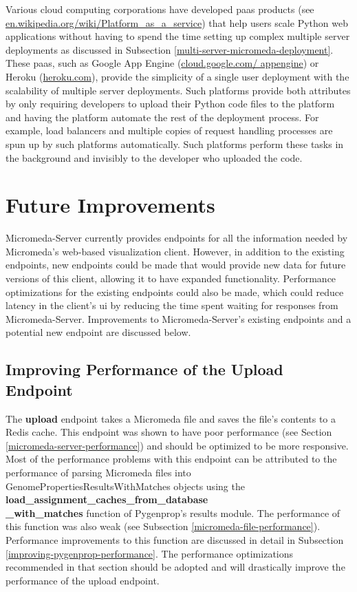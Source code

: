 Various cloud computing corporations have developed \gls{paas} 
\cite{lawton2008developing} products (see 
\href{http://en.wikipedia.org/wiki/Platform_as_a_service}{en.wikipedia.org/wiki/Platform\_as\_a\_service}) 
that help users scale Python web applications without having to spend the time 
setting up complex multiple server deployments as discussed in Subsection 
\ref{multi-server-micromeda-deployment}. These \gls{paas}, such as Google App 
Engine (\href{http://cloud.google.com/appengine}{cloud.google.com/ appengine}) 
or Heroku (\href{http://heroku.com}{heroku.com}), provide the simplicity of a 
single user deployment with the scalability of multiple server deployments. Such 
platforms provide both attributes by only requiring developers to upload their 
Python code files to the platform and having the platform automate the rest of 
the deployment process. For example, load balancers and multiple copies of 
request handling processes are spun up by such platforms automatically. Such 
platforms perform these tasks in the background and invisibly to the developer 
who uploaded the code.

\section{Future Improvements} \label{micromeda-server-improvements}

Micromeda-Server currently provides endpoints for all the information needed by 
Micromeda's web-based visualization client. However, in addition to the existing 
endpoints, new endpoints could be made that would provide new data for future 
versions of this client, allowing it to have expanded functionality. Performance 
optimizations for the existing endpoints could also be made, which could reduce 
latency in the client's \gls{ui} by reducing the time spent waiting for 
responses from Micromeda-Server. Improvements to Micromeda-Server's existing 
endpoints and a potential new endpoint are discussed below.

\subsection{Improving Performance of the Upload Endpoint}

The \textbf{upload} endpoint takes a Micromeda file and saves the file's 
contents to a Redis cache. This endpoint was shown to have poor performance (see 
Section \ref{micromeda-server-performance}) and should be optimized to be more 
responsive. Most of the performance problems with this endpoint can be 
attributed to the performance of parsing Micromeda files into 
GenomePropertiesResultsWithMatches objects using the 
\textbf{load\_assignment\_caches\_from\_database \\ \_with\_matches} function of 
Pygenprop's results module. The performance of this function was also weak (see 
Subsection \ref{micromeda-file-performance}). Performance improvements to this 
function are discussed in detail in Subsection 
\ref{improving-pygenprop-performance}. The performance optimizations recommended 
in that section should be adopted and will drastically improve the performance 
of the upload endpoint.

